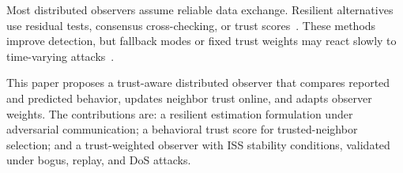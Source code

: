 \documentclass{ifacconf}
\begin{document}
Most distributed observers assume reliable data exchange. Resilient alternatives use residual tests, consensus cross-checking, or trust scores~\cite{Huy_LCSS,2_obs_Angelo,Guitao_multi_mesure,trust_physic_connecte,Wang_2021}. These methods improve detection, but fallback modes or fixed trust weights may react slowly to time-varying attacks~\cite{self_belive,Enhancing_control_trust}.

This paper proposes a trust-aware distributed observer that compares reported and predicted behavior, updates neighbor trust online, and adapts observer weights. The contributions are: a resilient estimation formulation under adversarial communication; a behavioral trust score for trusted-neighbor selection; and a trust-weighted observer with ISS stability conditions, validated under bogus, replay, and DoS attacks.



\end{document}
